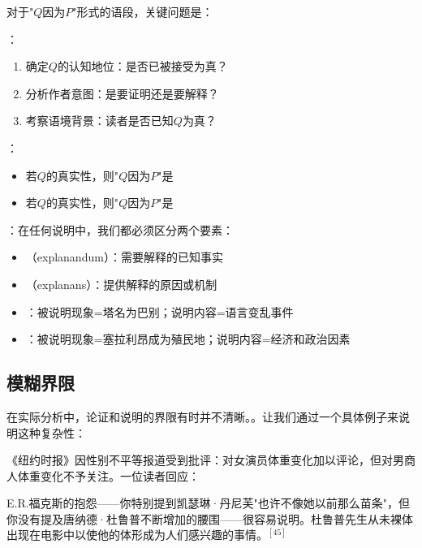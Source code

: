 \begin{theorembox}[title=实用区分方法]
对于"$Q$因为$P$"形式的语段，关键问题是：

：
\begin{enumerate}
  \item 确定$Q$的认知地位：是否已被接受为真？
  \item 分析作者意图：是要证明还是要解释？
  \item 考察语境背景：读者是否已知$Q$为真？
\end{enumerate}

：
\begin{itemize}
  \item 若$Q$的真实性，则"$Q$因为$P$"是
  \item 若$Q$的真实性，则"$Q$因为$P$"是
\end{itemize}
\end{theorembox}

：在任何说明中，我们都必须区分两个要素：
\begin{itemize}
  \item {}（explanandum）：需要解释的已知事实
  \item {}（explanans）：提供解释的原因或机制
\end{itemize}

\begin{examplebox}[title=说明结构的实例]
\begin{itemize}
  \item {}：被说明现象=塔名为巴别；说明内容=语言变乱事件
  \item {}：被说明现象=塞拉利昂成为殖民地；说明内容=经济和政治因素
\end{itemize}
\end{examplebox}

\subsection{模糊界限}

在实际分析中，论证和说明的界限有时并不清晰。。让我们通过一个具体例子来说明这种复杂性：

\begin{examplebox}[title=界限模糊的实例]
《纽约时报》因性别不平等报道受到批评：对女演员体重变化加以评论，但对男商人体重变化不予关注。一位读者回应：

\begin{displayquote}
E.R.福克斯的抱怨——你特别提到凯瑟琳·丹尼芙"也许不像她以前那么苗条"，但你没有提及唐纳德·杜鲁普不断增加的腰围——很容易说明。杜鲁普先生从未裸体出现在电影中以使他的体形成为人们感兴趣的事情。$^{[45]}$
\end{displayquote}
\end{examplebox}

